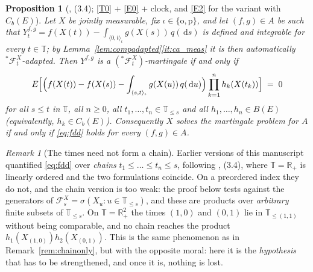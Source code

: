 \documentclass[11pt,a4paper]{article}
\theoremstyle{plain}
\newtheorem{proposition}[theorem]{Proposition}
\theoremstyle{definition}
\theoremstyle{remark}
\newtheorem{remark}[theorem]{Remark}
\newcommand{\R}{\mathbb{R}}
\newcommand{\Rp}{\R_+}
\newcommand{\T}{\mathbb{T}}                     %
\newcommand{\Bdd}{B}                           %
\newcommand{\Cb}{C_b}                          %
\newcommand{\Filt}{\mathcal{F}}
\newcommand{\dif}{\,\mathrm{d}}
\newcommand{\EK}{\cite{EK86}}
\begin{document}
\begin{proposition}[\EK, (3.4); \eqref{T0} + \eqref{E0} + clock, and \eqref{E2} for the variant with $\Cb(E)$]
  \label{prop:fddchar}
  Let $X$ be jointly measurable, fix $\iota \in \{\mathrm{o},\mathrm{p}\}$, and let
  $(f,g) \in A$ be such that
  $Y^{f,g}_t = f(X(t)) - \int_{\langle 0,t \rangle_\iota} g(X(s))\,q(\dif s)$ is
  defined and integrable for every $t \in \T$; by
  Lemma~\ref{lem:compadapted}\ref{it:ca_meas} it is then automatically
  ${}^{*}\Filt^X_t$-adapted.  Then $Y^{f,g}$ is a $({}^{*}\Filt^X_t)$-martingale
  if and only if
  \begin{equation}
    \label{eq:fdd}
    E\Bigl[ \Bigl( f(X(t)) - f(X(s))
        - \int_{\langle s,t \rangle_\iota} g(X(u)) \, q(\dif u) \Bigr)
        \prod_{k=1}^n h_k(X(t_k)) \Bigr] \;=\; 0
  \end{equation}
  for all $s \leq t$ in $\T$, all $n \geq 0$, all $t_1,\dots,t_n \in \T_{\leq s}$
  and all $h_1,\dots,h_n \in \Bdd(E)$ (equivalently, $h_k \in \Cb(E)$).
  Consequently $X$ solves the martingale problem for $A$ if and only if
  \eqref{eq:fdd} holds for every $(f,g) \in A$.
\end{proposition}

\begin{remark}[The times need not form a chain]
  \label{rem:fddnochain}
  Earlier versions of this manuscript quantified \eqref{eq:fdd} over
  \emph{chains} $t_1 \leq \dots \leq t_n \leq s$, following \EK, (3.4), where
  $\T = \Rp$ is linearly ordered and the two formulations coincide.  On a
  preordered index they do not, and the chain version is too weak: the proof
  below tests against the generators of $\Filt^X_s = \sigma(X_u : u \in \T_{\leq s})$,
  and these are products over \emph{arbitrary} finite subsets of $\T_{\leq s}$.
  On $\T = \Rp^2$ the times $(1,0)$ and $(0,1)$ lie in $\T_{\leq (1,1)}$ without
  being comparable, and no chain reaches the product $h_1(X_{(1,0)})h_2(X_{(0,1)})$.
  This is the same phenomenon as in Remark~\ref{rem:chainonly}, but with the
  opposite moral: here it is the \emph{hypothesis} that has to be strengthened,
  and once it is, nothing is lost.
\end{remark}
\end{document}
